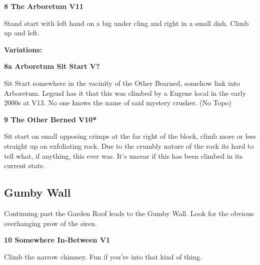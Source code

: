 	\begin{multicols}{2}


\needspace{1.5cm}
\label{rt:The Arboretum}
\colorbox{red!20}{
\parbox{0.95\linewidth}{
\textbf{
8 The Arboretum V11  
}}}
\begin{adjustwidth}{0.5cm}{}			
Stand start with left hand on a big under cling and right in a small dish. Climb up and left.
\end{adjustwidth}


\begin{adjustwidth}{0.5cm}{}				
\needspace{3cm}
\textbf{Variations:} \newline

\needspace{1.5cm}
\label{vr:Arboretum Sit Start}
\colorbox{black!20}{
\parbox{0.95\linewidth}{
\textbf{
8a Arboretum Sit Start V?  
}}}
\begin{adjustwidth}{0.5cm}{}			
Sit Start somewhere in the vacinity of the Other Bearned, somehow link into Arboretum. Legend has it that this was climbed by a Eugene local in the early 2000s at V13. No one knows the name of said mystery crusher.
  (No Topo)
\end{adjustwidth}



\end{adjustwidth}


\needspace{1.5cm}
\label{rt:The Other Berned}
\colorbox{red!20}{
\parbox{0.95\linewidth}{
\textbf{
9 The Other Berned V10*  
}}}
\begin{adjustwidth}{0.5cm}{}			
Sit start on small opposing crimps at the far right of the block, climb more or less straight up on exfoliating rock. Due to the crumbly nature of the rock its hard to tell what, if anything, this ever was. It's uncear if this has been climbed in its current state.
\end{adjustwidth}





\needspace{1.5cm}
\subsection*{Gumby Wall}\label{bf:Gumby Wall}
Continuing past the Garden Roof leads to the Gumby Wall. Look for the obvious overhanging prow of the siren.\\
	


\needspace{1.5cm}
\label{rt:Somewhere In-Between}
\colorbox{green!20}{
\parbox{0.95\linewidth}{
\textbf{
10 Somewhere In-Between V1  
}}}
\begin{adjustwidth}{0.5cm}{}			
Climb the narrow chimney. Fun if you're into that kind of thing.
\end{adjustwidth}





\end{multicols}
